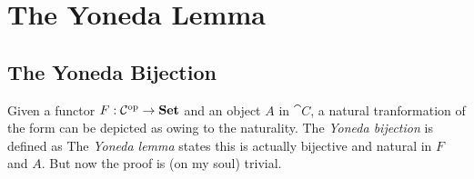 \section{The Yoneda Lemma}

\subsection{The Yoneda Bijection}

Given a functor $F : \mathcal{C}^{\operatorname{op}} \to \boldsymbol{\mathrm{Set}}$ and an object $A$ in $\cat{C}$, %
a natural tranformation of the form
can be depicted as
owing to the naturality.
\mynewline
The \textit{Yoneda bijection} is defined as 
The \textit{Yoneda lemma} states this is actually bijective and natural in $F$ and $A$. %
But now the proof is (on my soul) trivial.


